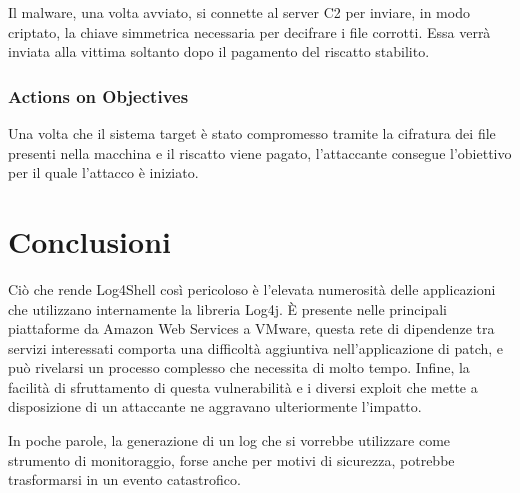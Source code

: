 \documentclass[a4paper, 12pt]{article}
\begin{document}
Il malware, una volta avviato, si connette al server C2 per inviare, in modo criptato, la chiave simmetrica necessaria per decifrare i file corrotti. Essa verrà inviata alla vittima soltanto dopo il pagamento del riscatto stabilito.


\subsubsection{Actions on Objectives}
Una volta che il sistema target è stato compromesso tramite la cifratura dei file presenti nella macchina e il riscatto viene pagato, l'attaccante consegue l’obiettivo per il quale l’attacco è iniziato.

\newpage

\section{Conclusioni}
Ciò che rende Log4Shell così pericoloso è l'elevata numerosità delle applicazioni che utilizzano internamente la libreria Log4j.
È presente nelle principali piattaforme da Amazon Web Services a VMware, questa rete di dipendenze tra servizi interessati comporta una difficoltà aggiuntiva nell’applicazione di patch, e può rivelarsi un processo complesso che necessita di molto tempo.
Infine, la facilità di sfruttamento di questa vulnerabilità e i diversi exploit che mette a disposizione di un attaccante ne aggravano ulteriormente l’impatto. 

In poche parole, la generazione di un log che si vorrebbe utilizzare come strumento di monitoraggio, forse anche per motivi  di sicurezza, potrebbe trasformarsi in un evento catastrofico.

\newpage


\nocite{*}

\end{document}
